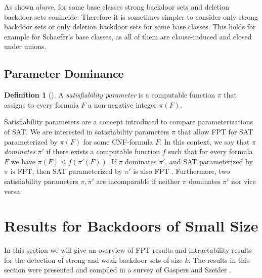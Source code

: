 \documentclass[11pt,a4paper]{article}
\theoremstyle{definition}
\newtheorem{definition}{Definition}[section]
\theoremstyle{proposition}
\begin{document}
As shown above, for some base classes strong backdoor sets and deletion backdoor sets conincide. Therefore it is sometimes simpler to consider only strong backdoor sets or only deletion backdoor sets for some base classes. This holds for example for Schaefer's base classes, as all of them are clause-induced and closed under unions. 

\subsection{Parameter Dominance}
\begin{definition}[{\cite[p.422]{HandbookOfSAT}}]
A \textit{satisfiability parameter} is a computable function $\pi$ that assigns to every formula $F$ a non-negative integer $\pi(F)$. 
\end{definition}
Satisfiability parameters are a concept introduced to compare parameterizations of SAT. We are interested in satisfiability parameters $\pi$ that allow FPT for SAT parameterized by $\pi(F)$ for some CNF-formula $F$. In this context, we say that $\pi$ \textit{dominates} $\pi'$ if there exists a computable function $f$ such that for every formula $F$ we have $\pi(F) \leq f(\pi'(F))$. If $\pi$ dominates $\pi'$, and SAT parameterized by $\pi$ is FPT, then SAT parameterized by $\pi'$ is also FPT \cite[p.423]{HandbookOfSAT}. Furthermore, two satisfiability parameters $\pi, \pi'$ are incomparable if neither $\pi$ dominates $\pi'$ nor vice versa. 

\section{Results for Backdoors of Small Size}
\label{sec:smallbackdoors}

In this section we will give an overview of FPT results and intractability results for the detection of strong and weak backdoor sets of size $k$. The results in this section were presented and compiled in a survey of Gaspers and Szeider \cite{Gaspers2012}. 
\end{document}
